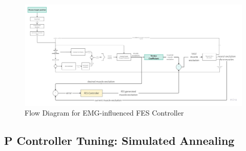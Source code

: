 \newpage
\begin{landscape} %
  \begin{figure}[h!]
    \centering
    \includegraphics[width=1.7\textwidth]{Pictures/Controller/FESController.jpg} %
    \caption{Flow Diagram for EMG-influenced FES Controller} %
    \label{fig:FESController} %
  \end{figure}
\end{landscape} %

\subsection{P Controller Tuning: Simulated Annealing}
